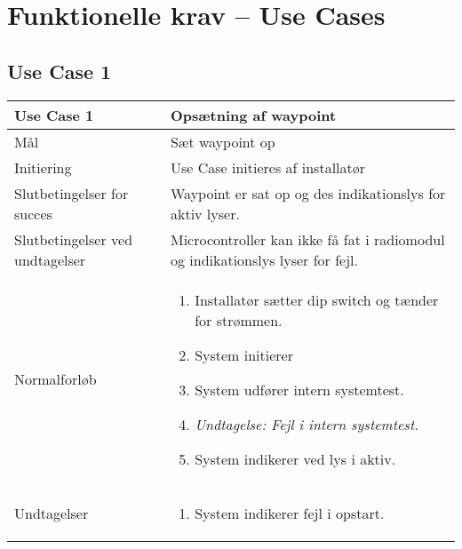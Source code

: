 \documentclass[Main]{subfiles}
\begin{document}
\section{Funktionelle krav -- Use Cases}


%


\subsection{Use Case 1}

\begin{longtable}{|p{}|p{}|}
\hline
Use Case 1 	& Opsætning af waypoint \\ \hline

Mål 		& Sæt waypoint op \\ \hline

Initiering	& Use Case initieres af installatør \\ \hline

Slutbetingelser for succes & Waypoint er sat op og des indikationslys for aktiv lyser.  \\ \hline

Slutbetingelser ved undtagelser & 
Microcontroller kan ikke få fat i radiomodul og indikationslys lyser for fejl. \\ \hline

Normalforløb &	\vspace{-8mm}
	\begin{enumerate}[noitemsep,nolistsep,leftmargin=*]
	\item Installatør sætter dip switch og tænder for strømmen.
	\item System initierer
	\item System udfører intern systemtest.
	\item[]	\textit{Undtagelse: Fejl i intern systemtest.}
	\item System indikerer ved lys i aktiv.
	\end{enumerate} \\ \hline

Undtagelser & \vspace{-8mm}
	\begin{enumerate}[noitemsep,nolistsep,leftmargin=*]
	\item System indikerer fejl i opstart.
	\end{enumerate} \\

\hline
\end{longtable}
\end{document}
